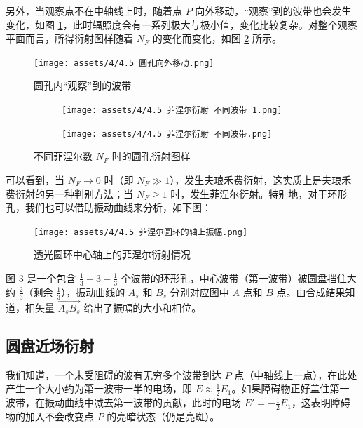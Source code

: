 \documentclass[UTF8]{report}
\theoremstyle{MyLineTheoremStyle} %
\theoremstyle{MyBlockTheoremStyle} %
\theoremstyle{MySubsubsectionStyle} %
\begin{document}
另外，当观察点不在中轴线上时，随着点 $P$ 向外移动，“观察”到的波带也会发生变化，如图 \ref{圆孔向外移动}，此时辐照度会有一系列极大与极小值，变化比较复杂。对整个观察平面而言，所得衍射图样随着 $N_F$ 的变化而变化，如图 \ref{不同菲涅尔数时的圆孔衍射图样} 所示。
\begin{figure}[H]\centering
    \texttt{[image: assets/4/4.5 圆孔向外移动.png]}
    \caption{圆孔内“观察”到的波带}\label{圆孔向外移动}
\end{figure}
\begin{figure}[H]\centering
\begin{subfigure}[b]{0.59\columnwidth}\centering
    \texttt{[image: assets/4/4.5 菲涅尔衍射 不同波带 1.png]}
\end{subfigure}
\begin{subfigure}[b]{0.39\columnwidth}\centering
    \texttt{[image: assets/4/4.5 菲涅尔衍射 不同波带.png]}
\end{subfigure}
\caption{不同菲涅尔数 $N_F$ 时的圆孔衍射图样}
\label{不同菲涅尔数时的圆孔衍射图样}
\end{figure}



可以看到，当 $N_F \to 0 $ 时（即 $N_F \gg 1$），发生夫琅禾费衍射，这实质上是夫琅禾费衍射的另一种判别方法；当 $N_F \geqslant 1$ 时，发生菲涅尔衍射。特别地，对于环形孔，我们也可以借助振动曲线来分析，如下图：
\begin{figure}[H]\centering
    \texttt{[image: assets/4/4.5 菲涅尔圆环的轴上振幅.png]}
    \caption{透光圆环中心轴上的菲涅尔衍射情况}\label{透光圆环中心轴上的菲涅尔衍射情况}
\end{figure}
图 \ref{透光圆环中心轴上的菲涅尔衍射情况} 是一个包含 $\frac{1}{3} + 3 + \frac{1}{3}$ 个波带的环形孔，中心波带（第一波带）被圆盘挡住大约 $\frac{2}{3}$（剩余 $\frac{1}{3}$），振动曲线的 $A_s$ 和 $B_s$ 分别对应图中 $A$ 点和 $B$ 点。由合成结果知道，相矢量 $\overrightarrow{A_sB_s}$ 给出了振幅的大小和相位。

\subsection{圆盘近场衍射}

我们知道，一个未受阻碍的波有无穷多个波带到达 $P$ 点（中轴线上一点），在此处产生一个大小约为第一波带一半的电场，即 $E \approx \frac{1}{2} E_1$。如果障碍物正好盖住第一波带，在振动曲线中减去第一波带的贡献，此时的电场 $E' = -\frac{1}{2}E_1$，这表明障碍物的加入不会改变点 $P$ 的亮暗状态（仍是亮斑）。
\end{document}

